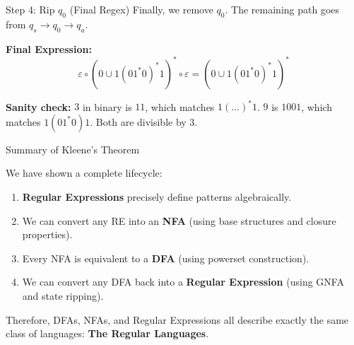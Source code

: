 \documentclass[10pt,aspectratio=169]{beamer}
\newcommand{\eps}{\varepsilon}
\begin{document}
\begin{frame}{Step 4: Rip $q_0$ (Final Regex)}
Finally, we remove $q_0$. The remaining path goes from $q_s \to q_0 \to q_a$.

\vspace{0.5em}
\textbf{Final Expression:}
\[
\eps \circ \left( 0 \cup 1(01^*0)^*1 \right)^* \circ \eps = (0 \cup 1(01^*0)^*1)^*
\]

\begin{center}
\end{center}

\vspace{0.5em}
\small \textbf{Sanity check:} $3$ in binary is $11$, which matches $1(\dots)^*1$. $9$ is $1001$, which matches $1(01^*0)1$. Both are divisible by 3.
\end{frame}

\begin{frame}{Summary of Kleene's Theorem}

We have shown a complete lifecycle:

\begin{enumerate}
    \item \textbf{Regular Expressions} precisely define patterns algebraically.
    \item We can convert any RE into an \textbf{NFA} (using base structures and closure properties).
    \item Every NFA is equivalent to a \textbf{DFA} (using powerset construction).
    \item We can convert any DFA back into a \textbf{Regular Expression} (using GNFA and state ripping).
\end{enumerate}

\vspace{1em}
\pause
Therefore, DFAs, NFAs, and Regular Expressions all describe exactly the same class of languages: \textbf{The Regular Languages}.

\end{frame}
\end{document}
